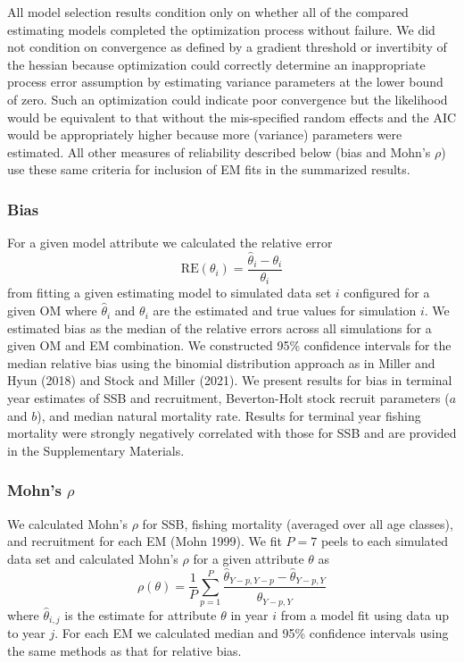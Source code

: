\documentclass[
  12pt,
]{article}
\begin{document}
All model selection results condition only on whether all of the
compared estimating models completed the optimization process without
failure. We did not condition on convergence as defined by a gradient
threshold or invertibity of the hessian because optimization could
correctly determine an inappropriate process error assumption by
estimating variance parameters at the lower bound of zero. Such an
optimization could indicate poor convergence but the likelihood would be
equivalent to that without the mis-specified random effects and the AIC
would be appropriately higher because more (variance) parameters were
estimated. All other measures of reliability described below (bias and
Mohn's \(\rho\)) use these same criteria for inclusion of EM fits in the
summarized results.

\subsubsection*{Bias}\label{bias}

For a given model attribute we calculated the relative error
\begin{equation}\label{relerror}
\text{RE}\left(\theta_i\right) = \frac{\widehat \theta_i - \theta_i}{\theta_i}
\end{equation} from fitting a given estimating model to simulated data
set \(i\) configured for a given OM where \(\widehat \theta_i\) and
\(\theta_i\) are the estimated and true values for simulation \(i\). We
estimated bias as the median of the relative errors across all
simulations for a given OM and EM combination. We constructed 95\%
confidence intervals for the median relative bias using the binomial
distribution approach as in Miller and Hyun (2018) and Stock and Miller
(2021). We present results for bias in terminal year estimates of SSB
and recruitment, Beverton-Holt stock recruit parameters (\(a\) and
\(b\)), and median natural mortality rate. Results for terminal year
fishing mortality were strongly negatively correlated with those for SSB
and are provided in the Supplementary Materials.

\subsubsection*{\texorpdfstring{Mohn's
\(\rho\)}{Mohn's \textbackslash rho}}\label{mohns-rho}

We calculated Mohn's \(\rho\) for SSB, fishing mortality (averaged over
all age classes), and recruitment for each EM (Mohn 1999). We fit
\(P =7\) peels to each simulated data set and calculated Mohn's \(\rho\)
for a given attribute \(\theta\) as \begin{equation}\label{mohns_rho}
\rho\left(\theta\right) = \frac{1}{P}\sum^P_{p=1} \frac{\widehat \theta_{Y-p,Y-p} - \widehat\theta_{Y-p,Y}}{\widehat\theta_{Y-p,Y}}
\end{equation} where \(\widehat \theta_{i,j}\) is the estimate for
attribute \(\theta\) in year \(i\) from a model fit using data up to
year \(j\). For each EM we calculated median and 95\% confidence
intervals using the same methods as that for relative bias.
\end{document}
